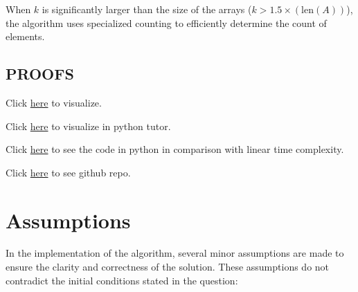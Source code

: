 \documentclass{article}
\begin{document}
When $k$ is significantly larger than the size of the arrays ($k > 1.5 \times (\text{{len}}(A))$), the algorithm uses specialized counting to efficiently determine the count of elements.
\subsection{PROOFS}
Click \href{https://rb.gy/kmkffz}{here} to visualize.

Click \href{https://rb.gy/djvg8p}{here} to visualize in python tutor.

Click \href{https://colab.research.google.com/drive/1TYO-ctS_yVKtta_lZzQUwnzjg9aVDQJq?usp=sharing}{here} to see the code in python in comparison with linear time complexity.

Click \href{https://github.com/ad4-rush/ADA-Assignment-1.git}{here} to see github repo.
\section{Assumptions}


In the implementation of the algorithm, several minor assumptions are made to ensure the clarity and correctness of the solution. These assumptions do not contradict the initial conditions stated in the question:
\end{document}
